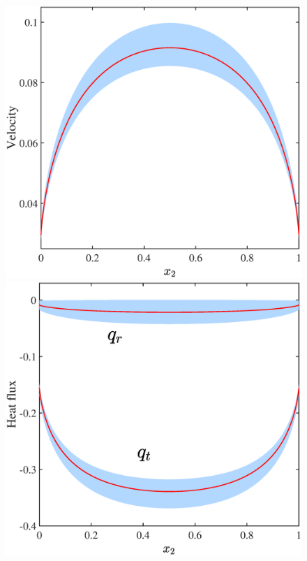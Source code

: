 \begin{figure}[t]
	\centering
	\includegraphics[scale=0.245,clip=true]{Fig/Creep_u_vA}\quad
	\includegraphics[scale=0.245,clip=true]{Fig/Creep_Q_vA}\\
	\vskip 0.5cm

\end{figure}
